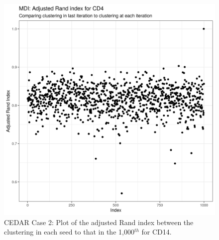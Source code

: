 \documentclass[14pt]{extarticle} %
\begin{document}
	\begin{figure}[h]
		\centering
		\includegraphics[scale=0.75]{Images/Biology_data/Set_1000/All_datasets/Adjusted_rand_index_plots/rand_index_plot_CD4.png}
		\caption{CEDAR Case 2: Plot of the adjusted Rand index between the clustering in each seed to that in the 1,000$^{th}$ for CD14.}
		\label{fig:results:cedar_2:mdi_cd4_adj_rand_ind_plot}
	\end{figure}
	
	
\end{document}
